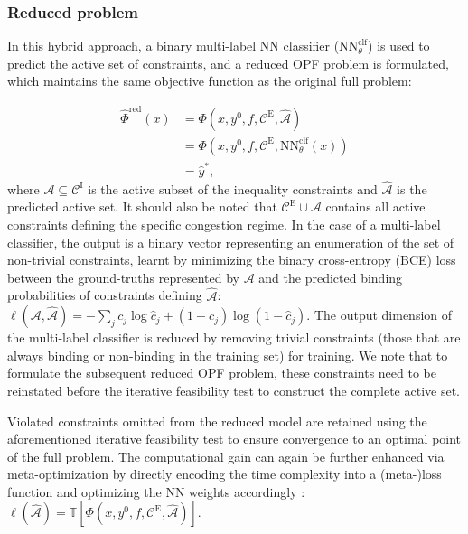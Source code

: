 \documentclass[journal]{IEEEtran}
\begin{document}
\subsubsection{Reduced problem}
In this hybrid approach, a binary multi-label NN classifier ($\mathrm{NN}_{\theta}^{\mathrm{clf}}$) is used to predict the active set of constraints, and a reduced OPF problem is formulated, which maintains the same objective function as the original full problem:

\begin{align}
    \hat{\Phi}^{\mathrm{red}}(x) & = \Phi \left( x, y^{0}, f, \mathcal{C}^{\mathrm{E}}, \hat{\mathcal{A}} \right) \\ & = \Phi \left( x, y^{0}, f, \mathcal{C}^{\mathrm{E}}, \mathrm{NN}_{\theta}^{\mathrm{clf}}(x) \right) \\ &= \hat{y}^{*},
\end{align}
where $\mathcal{A} \subseteq \mathcal{C}^{\mathrm{I}}$ is the active subset of the inequality constraints and $\hat{\mathcal{A}}$ is the predicted active set. It should also be noted that $\mathcal{C}^{\mathrm{E}} \cup \mathcal{A}$ contains all active constraints defining the specific congestion regime. In the case of a multi-label classifier, the output is a binary vector representing an enumeration of the set of non-trivial constraints, learnt by minimizing the binary cross-entropy (BCE) loss between the ground-truths represented by $\mathcal{A}$ and the predicted binding probabilities of constraints defining $\hat{\mathcal{A}}$: $\ell(\mathcal{A}, \hat{\mathcal{A}}) = -\sum \limits_{j} c_{j} \log \hat{c}_{j} + (1 - c_{j}) \log (1 - \hat{c}_{j})$. The output dimension of the multi-label classifier is reduced by removing trivial constraints (those that are always binding or non-binding in the training set) for training. We note that to formulate the subsequent reduced OPF problem, these constraints need to be reinstated before the iterative feasibility test to construct the complete active set.

Violated constraints omitted from the reduced model are retained using the aforementioned iterative feasibility test to ensure convergence to an optimal point of the full problem.  The computational gain can again be further enhanced via meta-optimization by directly encoding the time complexity into a (meta-)loss function and optimizing the NN weights accordingly \cite{Robson2020}: $\ell(\hat{\mathcal{A}}) = \mathbb{T} \left[\Phi \left( x, y^{0}, f, \mathcal{C}^{\mathrm{E}}, \hat{\mathcal{A}} \right)\right]$.
\end{document}

